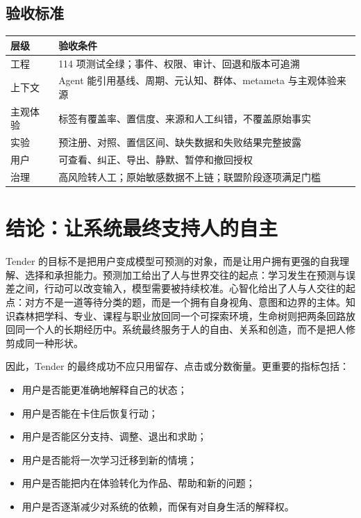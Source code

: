 \documentclass[UTF8,a4paper,11pt]{ctexart}
\begin{document}
\subsection{验收标准}

\begin{center}
\begin{longtable}{@{}p{4.3cm}p{8.5cm}@{}}
\toprule
\textbf{层级} & \textbf{验收条件} \\
\midrule
工程 & 114 项测试全绿；事件、权限、审计、回退和版本可追溯 \\
上下文 & Agent 能引用基线、周期、元认知、群体、metameta 与主观体验来源 \\
主观体验 & 标签有覆盖率、置信度、来源和人工纠错，不覆盖原始事实 \\
实验 & 预注册、对照、置信区间、缺失数据和失败结果完整披露 \\
用户 & 可查看、纠正、导出、静默、暂停和撤回授权 \\
治理 & 高风险转人工；原始敏感数据不上链；联盟阶段逐项满足门槛 \\
\bottomrule
\end{longtable}
\end{center}

\newpage
\section{结论：让系统最终支持人的自主}

Tender 的目标不是把用户变成模型可预测的对象，而是让用户拥有更强的自我理解、选择和承担能力。预测加工给出了人与世界交往的起点：学习发生在预测与误差之间，行动可以改变输入，模型需要被持续校准。心智化给出了人与人交往的起点：对方不是一道等待分类的题，而是一个拥有自身视角、意图和边界的主体。知识森林把学科、专业、课程与职业放回同一个可探索环境，生命树则把两条回路放回同一个人的长期经历中。系统最终服务于人的自由、关系和创造，而不是把人修剪成同一种形状。

因此，Tender 的最终成功不应只用留存、点击或分数衡量。更重要的指标包括：

\begin{itemize}
\item 用户是否能更准确地解释自己的状态；
\item 用户是否能在卡住后恢复行动；
\item 用户是否能区分支持、调整、退出和求助；
\item 用户是否能将一次学习迁移到新的情境；
\item 用户是否能把内在体验转化为作品、帮助和新的问题；
\item 用户是否逐渐减少对系统的依赖，而保有对自身生活的解释权。
\end{itemize}
\end{document}
